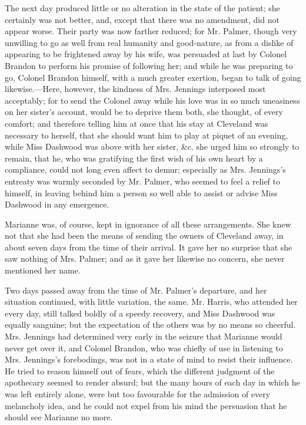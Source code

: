 The next day produced little or no alteration in the state of the patient; she certainly was not better, and, except that there was no amendment, did not appear worse. Their party was now farther reduced; for Mr. Palmer, though very unwilling to go as well from real humanity and good-nature, as from a dislike of appearing to be frightened away by his wife, was persuaded at last by Colonel Brandon to perform his promise of following her; and while he was preparing to go, Colonel Brandon himself, with a much greater exertion, began to talk of going likewise.---Here, however, the kindness of Mrs. Jennings interposed most acceptably; for to send the Colonel away while his love was in so much uneasiness on her sister's account, would be to deprive them both, she thought, of every comfort; and therefore telling him at once that his stay at Cleveland was necessary to herself, that she should want him to play at piquet of an evening, while Miss Dashwood was above with her sister, &c. she urged him so strongly to remain, that he, who was gratifying the first wish of his own heart by a compliance, could not long even affect to demur; especially as Mrs. Jennings's entreaty was warmly seconded by Mr. Palmer, who seemed to feel a relief to himself, in leaving behind him a person so well able to assist or advise Miss Dashwood in any emergence.

Marianne was, of course, kept in ignorance of all these arrangements. She knew not that she had been the means of sending the owners of Cleveland away, in about seven days from the time of their arrival. It gave her no surprise that she saw nothing of Mrs. Palmer; and as it gave her likewise no concern, she never mentioned her name.

Two days passed away from the time of Mr. Palmer's departure, and her situation continued, with little variation, the same. Mr. Harris, who attended her every day, still talked boldly of a speedy recovery, and Miss Dashwood was equally sanguine; but the expectation of the others was by no means so cheerful. Mrs. Jennings had determined very early in the seizure that Marianne would never get over it, and Colonel Brandon, who was chiefly of use in listening to Mrs. Jennings's forebodings, was not in a state of mind to resist their influence. He tried to reason himself out of fears, which the different judgment of the apothecary seemed to render absurd; but the many hours of each day in which he was left entirely alone, were but too favourable for the admission of every melancholy idea, and he could not expel from his mind the persuasion that he should see Marianne no more.


